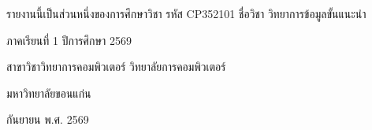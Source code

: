 \begin{titlepage}
\vfill

{\normalsize รายงานนี้เป็นส่วนหนึ่งของการศึกษาวิชา รหัส CP352101 ชื่อวิชา วิทยาการข้อมูลขั้นแนะนำ\par}
\vspace{0.2cm}
{\normalsize ภาคเรียนที่ 1 ปีการศึกษา 2569\par}
\vspace{0.2cm}
{\normalsize สาขาวิชาวิทยาการคอมพิวเตอร์ วิทยาลัยการคอมพิวเตอร์\par}
\vspace{0.2cm}
{\normalsize มหาวิทยาลัยขอนแก่น\par}
\vspace{0.2cm}
{\normalsize กันยายน พ.ศ. 2569\par}

\end{titlepage}
\clearpage

